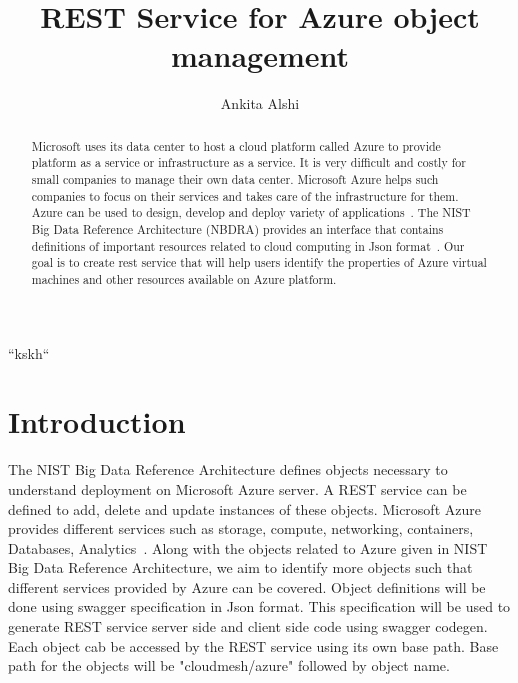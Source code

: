 
\title{REST Service for Azure object management}


\author{Ankita Alshi}


\renewcommand{\shortauthors}{Ankita Alshi}

``kskh``
\begin{abstract}
Microsoft uses its data center to host a cloud platform called Azure to
provide platform as a service or infrastructure as a service. It is very
difficult and costly for small companies to manage their own data center.
Microsoft Azure helps such companies to focus on their services and takes care
of the infrastructure for them. Azure can be used to design, develop and deploy
variety of applications~\cite{hid-sp18-502-microsoft-azure}. The NIST Big Data
 Reference Architecture (NBDRA) provides an interface that contains definitions
 of important resources related to cloud computing in Json
 format~\cite{hid-sp18-502-nist-vol8}. Our goal is to create rest service that
 will help users identify the properties of Azure virtual machines and other
 resources available on Azure platform.

\end{abstract}



\maketitle

\section{Introduction}
The NIST Big Data Reference Architecture defines objects necessary to
understand deployment on Microsoft Azure server. A REST service can be defined
to add, delete and update instances of these objects. Microsoft Azure
provides different services such as storage, compute, networking,
containers, Databases, Analytics~\cite{hid-sp18-502-microsoft-azure}. Along with
 the objects related to Azure given in NIST Big Data Reference Architecture, we
 aim to identify more objects such that different services provided by Azure can
 be covered. Object definitions will be done using swagger specification in
 Json format. This specification will be used to generate REST service server
 side and client side code using swagger codegen. Each object cab be accessed
 by the REST service using its own base path. Base path for the objects will be
 "cloudmesh/azure" followed by object name.


